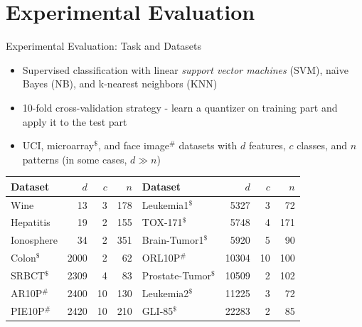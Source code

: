 \documentclass{beamer}
\begin{document}
\section[Experimental Evaluation]{Experimental Evaluation}
\begin{frame}{Experimental Evaluation: Task and Datasets}
\begin{itemize}
	\item Supervised classification with linear \emph{support vector machines} (SVM), na\"{\i}ve Bayes (NB), and k-nearest neighbors (KNN) 
	\item 10-fold cross-validation strategy - learn a quantizer on training part and apply it to the test part
	\item UCI, microarray$^\$$, and face image$^\#$ datasets with $d$ features, $c$ classes, and $n$ patterns (in some cases, $d \gg n$)
\end{itemize}
\vfill
\begin{table}
	\centering \scriptsize
	\begin{tabular}{|l|r|r|r||l|r|r|r|}
		\hline
		\textbf{Dataset} & $d$   &  $c$   & $n$    &  \textbf{Dataset} & $d$   &  $c$   & $n$  \\ \hline \hline
 	  Wine             & 13    &   3    &  178   &  Leukemia1$^\$$       & 5327    &   3    & 72 \\ \hline
 		Hepatitis        & 19    &   2    &  155   &  TOX-171$^\$$	 				 & 5748	   &   4	  &  171	\\ \hline
 		Ionosphere       & 34    &   2    &  351   &  Brain-Tumor1$^\$$    & 5920    &   5    &   90   \\ \hline
 		Colon$^\$$           & 2000    &   2    & 62   &  ORL10P$^\#$           & 10304   &  10   &  100    \\ \hline
 		SRBCT$^\$$           & 2309    &   4    & 83   & Prostate-Tumor$^\$$   & 10509   &   2    &  102 \\ \hline
 		AR10P$^\#$          & 2400    &  10    &   130  &   	   Leukemia2$^\$$       & 11225   &   3    &   72   \\ \hline
    PIE10P$^\#$         & 2420    &  10    &   210  &       GLI-85$^\$$	         & 22283	 &   2	  &   85   \\ \hline 		 
\end{tabular}
\label{TAB1}
\end{table}
\end{frame}


\end{document}
